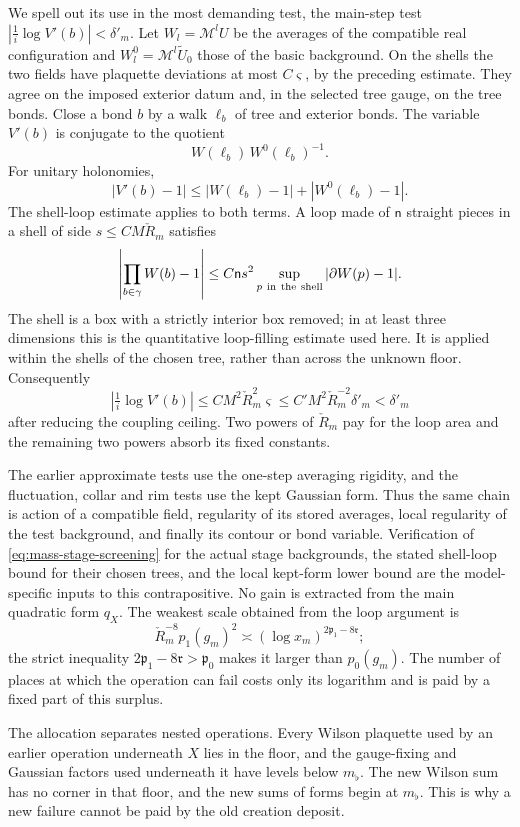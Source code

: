 \documentclass[11pt,letterpaper,reqno]{amsart}
\theoremstyle{definition}
\theoremstyle{remark}
\begin{document}
We spell out its use in the most demanding test, the main-step
test \(|\tfrac1i\log V'(b)|<\delta'_m\).
Let \(W_l=\mathcal M^lU\) be the averages of the compatible real
configuration and \(W_l^0=\mathcal M^l\tilde U_0\) those of the
basic background. On the shells the two fields have plaquette
deviations at most \(C\varsigma\), by the preceding estimate.
They agree on the imposed exterior datum and, in the selected
tree gauge, on the tree bonds. Close a bond \(b\) by a walk
\(\ell_b\) of tree and exterior bonds. The variable \(V'(b)\) is
conjugate to the quotient
\[
 W(\ell_b)\,W^0(\ell_b)^{-1}.
\]
For unitary holonomies,
\[
 |V'(b)-1|
 \le |W(\ell_b)-1|+|W^0(\ell_b)-1|.
\]
The shell-loop estimate applies to both terms. A loop made of
\(\mathsf n\) straight pieces in a shell of side
\(s\le CM\check R_m\) satisfies
\[
 \left|\prod_{b\in\gamma}W(b)-1\right|
 \le C\mathsf n s^2
                       \sup_{p\ {\rm in\ the\ shell}}|\partial W(p)-1|.
\]
The shell is a box with a strictly interior box removed; in at
least three dimensions this is the quantitative loop-filling
estimate used here. It is applied within the shells of the
chosen tree, rather than across the unknown floor. Consequently
\[
 \left|\tfrac1i\log V'(b)\right|
       \le CM^2\check R_m^2\varsigma
       \le C'M^2\check R_m^{-2}\delta'_m
       <\delta'_m
\]
after reducing the coupling ceiling. Two powers of \(\check R_m\)
pay for the loop area and the remaining two powers absorb its
fixed constants.

The earlier approximate tests use the one-step averaging rigidity,
and the fluctuation, collar and rim tests use the kept Gaussian
form. Thus the same chain is action of a compatible field,
regularity of its stored averages, local regularity of the test
background, and finally its contour or bond variable. Verification
of \eqref{eq:mass-stage-screening} for the actual stage backgrounds,
the stated shell-loop bound for their chosen trees, and the
local kept-form lower bound are the model-specific inputs to this
contrapositive. No gain is extracted from the main quadratic
form \(q_X\). The weakest scale obtained from the loop argument is
\[
 \check R_m^{-8}p_1(g_m)^2
       \asymp(\log x_m)^{2\mathfrak p_1-8\mathfrak r};
\]
the strict inequality
\(2\mathfrak p_1-8\mathfrak r>\mathfrak p_0\)
makes it larger than \(p_0(g_m)\). The number of places at which
the operation can fail costs only its logarithm and is paid by a
fixed part of this surplus.

The allocation separates nested operations. Every Wilson plaquette
used by an earlier operation underneath \(X\) lies in the floor,
and the gauge-fixing and Gaussian factors used underneath it have
levels below \(m_\flat\). The new Wilson sum has no corner in that
floor, and the new sums of forms begin at \(m_\flat\).
This is why a new failure cannot be paid by the old creation deposit.
\end{document}
